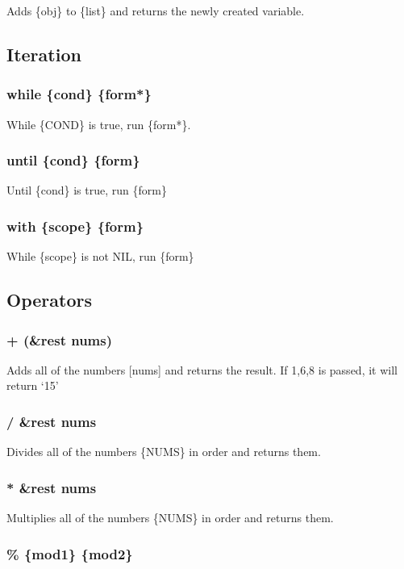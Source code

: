 \documentclass{article}
\begin{document}
	Adds \{obj\} to \{list\} and returns the newly created variable.
	
	\subsection{Iteration}
	
	\subsubsection{while \{cond\} \{form*\}}
	
	While \{COND\} is true, run \{form*\}.
	
	\subsubsection{until \{cond\} \{form\}}
	
	Until \{cond\} is true, run \{form\}
	
	\subsubsection{with \{scope\} \{form\}}
	
	While \{scope\} is not NIL, run \{form\}
	\subsection{Operators}
	
	\subsubsection{+ (\&rest nums)}
	
	Adds all of the numbers [nums] and returns the result. If {1,6,8} is passed, it will return `15'
	
	\subsubsection{/ \&rest nums}
	
	Divides all of the numbers \{NUMS\} in order and returns them.
	
	\subsubsection{* \&rest nums}
	
	Multiplies all of the numbers \{NUMS\} in order and returns them.
	
	\subsubsection{\% \{mod1\} \{mod2\}}
	
\end{document}
